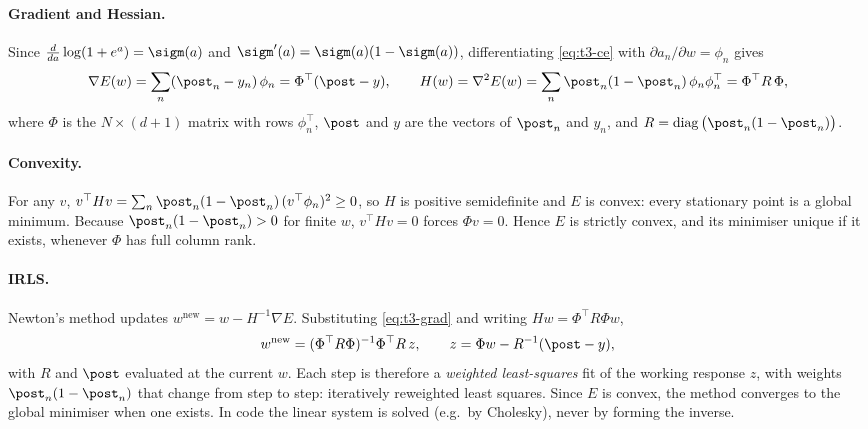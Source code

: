 \paragraph{Gradient and Hessian.}
Since $\frac{d}{da}\log(1+e^{a})=\sigm(a)$ and $\sigm'(a)=\sigm(a)(1-\sigm(a))$, differentiating
\eqref{eq:t3-ce} with $\partial a_n/\partial w=\phi_n$ gives
\begin{equation}
  \nabla E(w) = \sum_{n} (\post_n - y_n)\,\phi_n = \Phi^\top(\post-y), \qquad
  H(w) = \nabla^2E(w) = \sum_n \post_n(1-\post_n)\,\phi_n\phi_n^\top = \Phi^\top R\,\Phi ,
  \label{eq:t3-grad}
\end{equation}
where $\Phi$ is the $N\times(d+1)$ matrix with rows $\phi_n^\top$, $\post$ and $y$ are the vectors of
$\post_n$ and $y_n$, and $R=\operatorname{diag}\big(\post_n(1-\post_n)\big)$.

\paragraph{Convexity.}
For any $v$, $v^\top H v = \sum_n \post_n(1-\post_n)\,(v^\top\phi_n)^2 \ge 0$, so $H$ is positive
semidefinite and $E$ is convex: every stationary point is a global minimum. Because
$\post_n(1-\post_n)>0$ for finite $w$, $v^\top Hv=0$ forces $\Phi v=0$. Hence $E$ is strictly convex,
and its minimiser unique if it exists, whenever $\Phi$ has full column rank.

\paragraph{IRLS.}
Newton's method updates $w^{\mathrm{new}} = w - H^{-1}\nabla E$. Substituting
\eqref{eq:t3-grad} and writing $H w=\Phi^\top R\Phi w$,
\begin{equation}
  w^{\mathrm{new}} = (\Phi^\top R\Phi)^{-1}\Phi^\top R\,z, \qquad
  z = \Phi w - R^{-1}(\post-y),
  \label{eq:t3-irls}
\end{equation}
with $R$ and $\post$ evaluated at the current $w$. Each step is therefore a \emph{weighted least-squares}
fit of the working response $z$, with weights $\post_n(1-\post_n)$ that change from step to step:
iteratively reweighted least squares. Since $E$ is convex, the method converges to the global
minimiser when one exists. In code the linear system is solved (e.g.\ by Cholesky), never by
forming the inverse.

